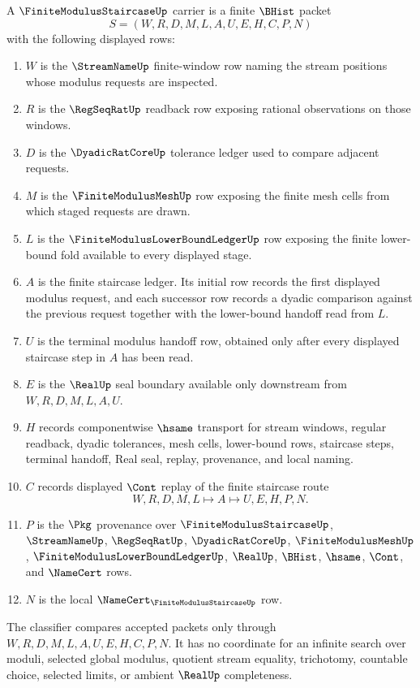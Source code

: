 \begin{definition}
\label{def:finite-modulus-staircase-carrier}
A $\FiniteModulusStaircaseUp$ carrier is a finite $\BHist$ packet
$$
S=(W,R,D,M,L,A,U,E,H,C,P,N)
$$
with the following displayed rows:
\begin{enumerate}
\item $W$ is the $\StreamNameUp$ finite-window row naming the stream positions whose modulus requests are inspected.
\item $R$ is the $\RegSeqRatUp$ readback row exposing rational observations on those windows.
\item $D$ is the $\DyadicRatCoreUp$ tolerance ledger used to compare adjacent requests.
\item $M$ is the $\FiniteModulusMeshUp$ row exposing the finite mesh cells from which staged requests are drawn.
\item $L$ is the $\FiniteModulusLowerBoundLedgerUp$ row exposing the finite lower-bound fold available to every displayed stage.
\item $A$ is the finite staircase ledger. Its initial row records the first displayed modulus request, and each successor row records a dyadic comparison against the previous request together with the lower-bound handoff read from $L$.
\item $U$ is the terminal modulus handoff row, obtained only after every displayed staircase step in $A$ has been read.
\item $E$ is the $\RealUp$ seal boundary available only downstream from $W,R,D,M,L,A,U$.
\item $H$ records componentwise $\hsame$ transport for stream windows, regular readback, dyadic tolerances, mesh cells, lower-bound rows, staircase steps, terminal handoff, Real seal, replay, provenance, and local naming.
\item $C$ records displayed $\Cont$ replay of the finite staircase route
$$
W,R,D,M,L \longmapsto A \longmapsto U,E,H,P,N .
$$
\item $P$ is the $\Pkg$ provenance over $\FiniteModulusStaircaseUp$, $\StreamNameUp$, $\RegSeqRatUp$, $\DyadicRatCoreUp$, $\FiniteModulusMeshUp$, $\FiniteModulusLowerBoundLedgerUp$, $\RealUp$, $\BHist$, $\hsame$, $\Cont$, and $\NameCert$ rows.
\item $N$ is the local $\NameCert_{\FiniteModulusStaircaseUp}$ row.
\end{enumerate}
The classifier compares accepted packets only through $W,R,D,M,L,A,U,E,H,C,P,N$. It has no coordinate for an infinite search over moduli, selected global modulus, quotient stream equality, trichotomy, countable choice, selected limits, or ambient $\RealUp$ completeness.
\end{definition}

